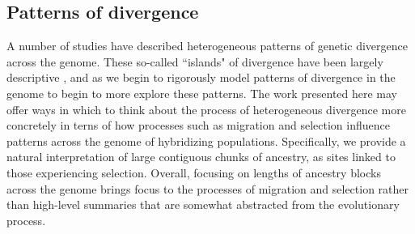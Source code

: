 \documentclass[11pt,letterpaper]{article}
\newcommand{\plr}[1]{{\em \color{blue} #1}}
\begin{document}
\subsection*{Patterns of divergence}  
A number of studies have described heterogeneous patterns of genetic divergence across the genome. These so-called ``islands" of divergence \citep{Turner2005,Nosil2009} have been largely descriptive \citep{Cruickshank2014,Noor2009}, and as we begin to rigorously model patterns of divergence in the genome to begin to more  explore these patterns. The work presented here may offer ways in which to think about the process of heterogeneous divergence more concretely in terns of how processes such as migration and selection influence patterns across the genome of hybridizing populations. Specifically, we provide a natural interpretation of large contiguous chunks of ancestry, as sites linked to those experiencing selection.   
Overall, focusing on lengths of ancestry blocks across the genome brings focus to the processes of migration and selection rather than high-level summaries that are somewhat abstracted from the evolutionary process. 





\end{document}
